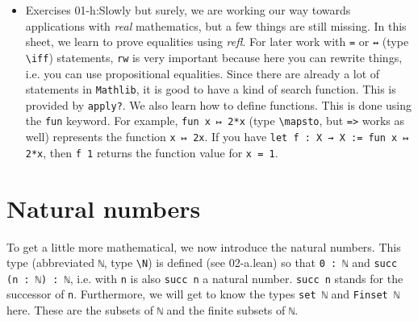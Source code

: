 \documentclass{memoir}
\begin{document}
\begin{itemize}
\item Exercises 01-h:Slowly but surely, we are working our way towards applications with \emph{real} mathematics, but a few things are still missing. In this sheet, we learn to prove equalities using \emph{refl}. For later work with \Verb|=| or \Verb|↔| (type \Verb|\iff|) statements, \Verb|rw| is very important because here you can rewrite things, i.e. you can use propositional equalities. Since there are already a lot of statements in \Verb|Mathlib|, it is good to have a kind of search function. This is provided by \Verb|apply?|. We also learn how to define functions. This is done using the \Verb|fun| keyword. For example, \Verb|fun x ↦ 2*x| (type \Verb|\mapsto|, but \Verb|=>| works as well) represents the function \Verb|x ↦ 2x|. If you have \Verb|let f : X → X := fun x ↦ 2*x|, then \Verb|f 1| returns the function value for \Verb|x = 1|.
\end{itemize}




\section{Natural numbers}

To get a little more mathematical, we now introduce the natural numbers. This type (abbreviated \Verb|ℕ|, type \Verb|\N|) is defined (see 02-a.lean) so that \Verb|0 : ℕ| and \Verb|succ (n : ℕ) : ℕ|, i.e. with \Verb|n| is also \Verb|succ n| a natural number. \Verb|succ n| stands for the successor of \Verb|n|. Furthermore, we will get to know the types \Verb|set ℕ| and \Verb|Finset ℕ| here. These are the subsets of \Verb|ℕ| and the finite subsets of \Verb|ℕ|.
\end{document}
